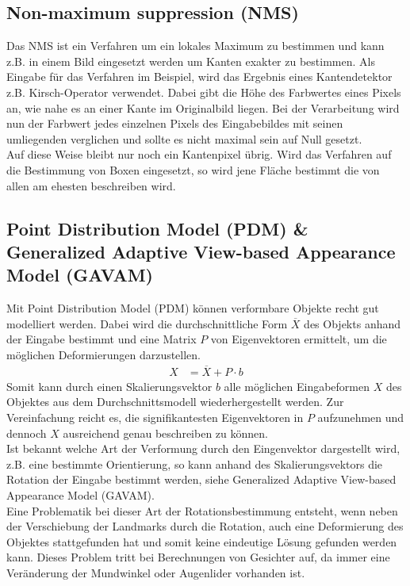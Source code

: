 \subsection{Non-maximum suppression  (NMS)}
Das NMS ist ein Verfahren um ein lokales Maximum zu bestimmen und kann z.B. in einem Bild eingesetzt werden um Kanten exakter zu bestimmen. Als Eingabe für das Verfahren im Beispiel, wird das Ergebnis eines Kantendetektor z.B. Kirsch-Operator verwendet. Dabei gibt die Höhe des Farbwertes eines Pixels an, wie nahe es an einer Kante im Originalbild liegen. Bei der Verarbeitung wird nun der Farbwert jedes einzelnen Pixels des Eingabebildes mit seinen umliegenden verglichen und sollte es nicht maximal sein auf Null gesetzt.\\
Auf diese Weise bleibt nur noch ein Kantenpixel übrig. Wird das Verfahren auf die Bestimmung von Boxen eingesetzt, so wird jene Fläche bestimmt die von allen am ehesten beschreiben wird.\\
\cite{NMS}\cite{wiki_Canny}
\subsection{Point Distribution Model (PDM) \& Generalized Adaptive View-based Appearance Model (GAVAM)}
Mit Point Distribution Model (PDM) können verformbare Objekte recht gut modelliert werden. Dabei wird die durchschnittliche Form $\overline{X}$ des Objekts anhand der Eingabe bestimmt und eine Matrix $P$ von Eigenvektoren ermittelt, um die möglichen Deformierungen darzustellen.
\begin{align*}
X &= \overline{X}+P\cdot b
\end{align*}
Somit kann durch einen Skalierungsvektor $b$ alle möglichen Eingabeformen $X$ des Objektes aus dem Durchschnittsmodell wiederhergestellt werden. Zur Vereinfachung reicht es, die signifikantesten Eigenvektoren in $P$ aufzunehmen und dennoch $X$ ausreichend genau beschreiben zu können.\\
Ist bekannt welche Art der Verformung durch den Eingenvektor dargestellt wird, z.B. eine bestimmte Orientierung, so kann anhand des Skalierungsvektors die Rotation der Eingabe bestimmt werden, siehe Generalized Adaptive View-based Appearance Model (GAVAM).\\
Eine Problematik bei dieser Art der Rotationsbestimmung entsteht, wenn neben der Verschiebung der Landmarks durch die Rotation, auch eine Deformierung des Objektes stattgefunden hat und somit keine eindeutige Lösung gefunden werden kann. Dieses Problem tritt bei Berechnungen von Gesichter auf, da immer eine Veränderung der Mundwinkel oder Augenlider vorhanden ist.\\
\cite{pdf_PDM}\cite{pdf_GAVAM}\cite{wiki_PDM}